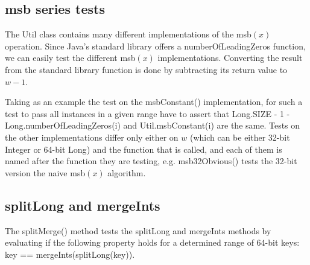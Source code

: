 \subsection{msb series tests}

The {\ttfamily Util} class contains many different implementations of the msb$(x)$ operation. Since Java's standard library offers a {\ttfamily numberOfLeadingZeros} function, we can easily test the different msb$(x)$ implementations. Converting the result from the standard library function is done by subtracting its return value to $w - 1$.

Taking as an example the test on the {\ttfamily msbConstant()} implementation, for such a test to pass all instances in a given range have to assert that {\ttfamily Long.SIZE - 1 - Long.numberOfLeadingZeros(i)} and {\ttfamily Util.msbConstant(i)} are the same. Tests on the other implementations differ only either on $w$ (which can be either 32-bit {\ttfamily Integer} or 64-bit {\ttfamily Long}) and the function that is called, and each of them is named after the function they are testing, e.g. {\ttfamily msb32Obvious()} tests the 32-bit version the naive msb$(x)$ algorithm.

\subsection{{\ttfamily splitLong} and {\ttfamily mergeInts}}

The {\ttfamily splitMerge()} method tests the {\ttfamily splitLong} and {\ttfamily mergeInts} methods by evaluating if the following property holds for a determined range of 64-bit keys: {\ttfamily key == mergeInts(splitLong(key))}.

